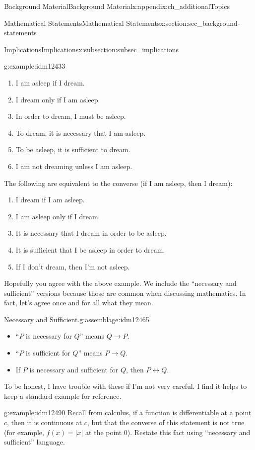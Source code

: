\documentclass[oneside,10pt,]{book}
\numberwithin{equation}{chapter}
\def\iff{\leftrightarrow}
\def\imp{\rightarrow}
\begin{document}
\begin{appendixptx}{Background Material}{}{Background Material}{}{}{x:appendix:ch_additionalTopics}
\begin{sectionptx}{Mathematical Statements}{}{Mathematical Statements}{}{}{x:section:sec_background-statements}
\begin{subsectionptx}{Implications}{}{Implications}{}{}{x:subsection:subsec_implications}
\begin{example}{}{g:example:idm12433}
\begin{enumerate}
\item{}I am asleep if I dream.%
\item{}I dream only if I am asleep.%
\item{}In order to dream, I must be asleep.%
\item{}To dream, it is necessary that I am asleep.%
\item{}To be asleep, it is sufficient to dream.%
\item{}I am not dreaming unless I am asleep.%
\end{enumerate}
The following are equivalent to the converse (if I am asleep, then I dream):%
\begin{enumerate}
\item{}I dream if I am asleep.%
\item{}I am asleep only if I dream.%
\item{}It is necessary that I dream in order to be asleep.%
\item{}It is sufficient that I be asleep in order to dream.%
\item{}If I don't dream, then I'm not asleep.%
\end{enumerate}
%
\end{example}
Hopefully you agree with the above example. We include the ``necessary and sufficient'' versions because those are common when discussing mathematics. In fact, let's agree once and for all what they mean.%
\begin{assemblage}{Necessary and Sufficient.}{g:assemblage:idm12465}%
\par
%
\begin{itemize}[label=\textbullet]
\item{}``\(P\) is necessary for \(Q\)'' means \(Q \imp P\).%
\item{}``\(P\) is sufficient for \(Q\)'' means \(P \imp Q\).%
\item{}If \(P\) is necessary and sufficient for \(Q\), then \(P \iff Q\).%
\end{itemize}
%
\end{assemblage}
To be honest, I have trouble with these if I'm not very careful. I find it helps to keep a standard example for reference.%
\begin{example}{}{g:example:idm12490}%
Recall from calculus, if a function is differentiable at a point \(c\), then it is continuous at \(c\), but that the converse of this statement is not true (for example, \(f(x) = |x|\) at the point 0). Restate this fact using ``necessary and sufficient'' language.%

\end{example}
\end{subsectionptx}
\end{sectionptx}
\end{appendixptx}
\end{document}
